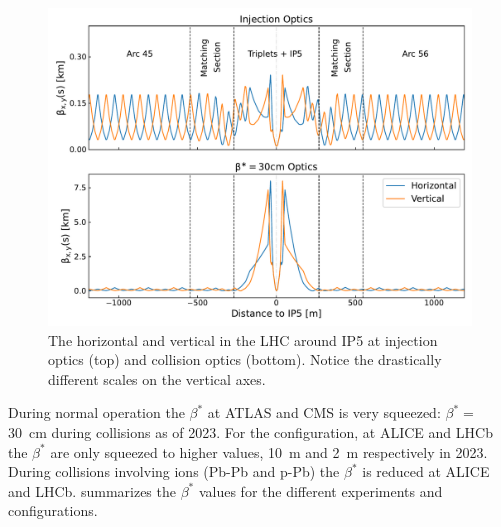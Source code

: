 \begin{figure}[!hbt]
  \centering
  \includegraphics*[width=0.99\linewidth]{Figures/Optics_Measurements_Corrections_at_LHC/ir5_surroundings_optics_2.pdf}
  \caption{The horizontal and vertical \betafunctions in the LHC around IP5 at injection optics (top) and collision optics (bottom). Notice the drastically different scales on the vertical axes.}
  \label{figure:ir5_and_around}
\end{figure}

During normal operation the \(\beta^{\ast}\) at ATLAS and CMS is very squeezed: \(\beta^{\ast} =\) \qty{30}{\centi\metre} during collisions as of \num{2023}.
For the configuration, at ALICE and LHCb the \(\beta^{\ast}\) are only squeezed to higher values, \qty{10}{\meter} and \qty{2}{\meter} respectively in \num{2023}.
During collisions involving ions (Pb-Pb and p-Pb) the \(\beta^{\ast}\) is reduced at ALICE and LHCb.
 summarizes the \(\beta^{\ast}\) values for the different experiments and configurations.

